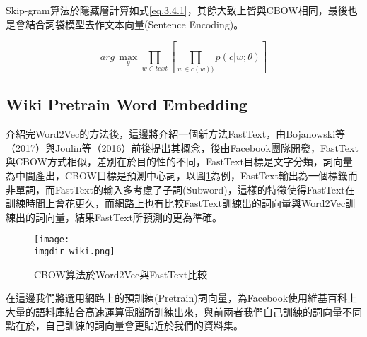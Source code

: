 	Skip-gram算法於隱藏層計算如式\ref{eq.3.4.1}，其餘大致上皆與CBOW相同，最後也是會結合詞袋模型去作文本向量(Sentence Encoding)。
	
\begin{equation}\label{eq.3.4.1}
	arg\,\max\limits_{\theta}\prod_{w\in text}\left [ \prod_{w\in c(w))} p(c|w;\theta) \right ]
\end{equation}

\subsection{Wiki Pretrain Word Embedding}

	介紹完Word2Vec的方法後，這邊將介紹一個新方法FastText，由Bojanowski等（2017）與Joulin等（2016）前後提出其概念，後由Facebook團隊開發，FastText與CBOW方式相似，差別在於目的性的不同，FastText目標是文字分類，詞向量為中間產出，CBOW目標是預測中心詞，以圖\ref{grap.3.4.1}為例，FastText輸出為一個標籤而非單詞，而FastText的輸入多考慮了子詞(Subword)，這樣的特徵使得FastText在訓練時間上會花更久，而網路上也有比較FastText訓練出的詞向量與Word2Vec訓練出的詞向量，結果FastText所預測的更為準確。
	
\begin{figure}[H]
    \centering
        \texttt{[image: \\imgdir wiki.png]}
    \caption{CBOW算法於Word2Vec與FastText比較}
    \label{grap.3.4.1}
\end{figure}

	在這邊我們將選用網路上的預訓練(Pretrain)詞向量，為Facebook使用維基百科上大量的語料庫結合高速運算電腦所訓練出來，與前兩者我們自己訓練的詞向量不同點在於，自己訓練的詞向量會更貼近於我們的資料集。

%












